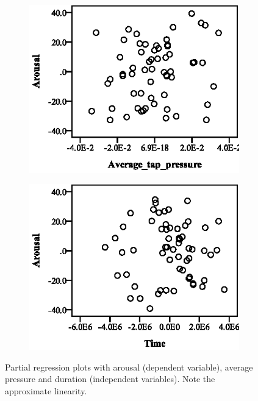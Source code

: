 \begin{figure}[ht]
  \centering
  \begin{subfigure}[b]{0.45\textwidth}
    \centering
    \includegraphics[width=\textwidth]{images/linearity/partialregression/arousal/ArAvgAvg.eps}
    \label{fig:aravgavg}
  \end{subfigure}
  \quad
  \begin{subfigure}[b]{0.45\textwidth}
    \centering
    \includegraphics[width=\textwidth]{images/linearity/partialregression/arousal/ArAvgTime.eps}
    \label{fig:aravgtime}
  \end{subfigure}
  \caption{Partial regression plots with arousal (dependent variable), average pressure and duration (independent variables). Note the approximate linearity.}
\end{figure}